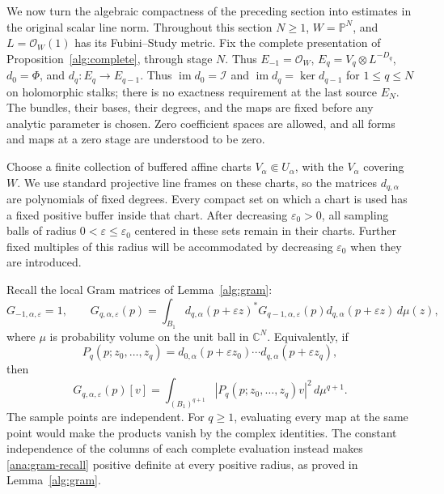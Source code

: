 \documentclass[11pt,reqno]{amsart}
\numberwithin{equation}{section}
\theoremstyle{definition}
\theoremstyle{remark}
\newcommand{\C}{\mathbb C}
\newcommand{\Pj}{\mathbb P}
\newcommand{\cO}{\mathcal O}
\newcommand{\cI}{\mathcal I}
\DeclareMathOperator{\im}{im}
\begin{document}
We now turn the algebraic compactness of the preceding section into
estimates in the original scalar line norm.  Throughout this section
$N\geq1$, $W=\Pj^N$, and $L=\cO_W(1)$ has its Fubini--Study metric.
Fix the complete presentation of Proposition~\ref{alg:complete}, through
stage $N$.  Thus $E_{-1}=\cO_W$, $E_q=V_q\otimes L^{-D_q}$,
$d_0=\Phi$, and $d_q:E_q\to E_{q-1}$.  Thus $\im d_0=\cI$ and
$\im d_q=\ker d_{q-1}$ for $1\leq q\leq N$ on holomorphic stalks;
there is no exactness requirement at the last source $E_N$.
The bundles, their bases, their degrees, and the maps are fixed before any
analytic parameter is chosen.  Zero coefficient spaces are allowed, and
all forms and maps at a zero stage are understood to be zero.

Choose a finite collection of buffered affine charts
$V_\alpha\Subset U_\alpha$, with the $V_\alpha$ covering $W$.
We use standard projective line frames on these charts, so the matrices
$d_{q,\alpha}$ are polynomials of fixed degrees.  Every compact set on
which a chart is used has a fixed positive buffer inside that chart.
After decreasing $\varepsilon_0>0$, all sampling balls of radius
$0<\varepsilon\leq\varepsilon_0$ centered in these sets remain in their
charts.  Further fixed multiples of this radius will be accommodated
by decreasing $\varepsilon_0$ when they are introduced.

Recall the local Gram matrices of Lemma~\ref{alg:gram}:
\begin{equation}\label{ana:gram-recall}
 G_{-1,\alpha,\varepsilon}=1,\qquad
 G_{q,\alpha,\varepsilon}(p)
 =\int_{B_1}d_{q,\alpha}(p+\varepsilon z)^*
 G_{q-1,\alpha,\varepsilon}(p)
 d_{q,\alpha}(p+\varepsilon z)\,d\mu(z),
\end{equation}
where $\mu$ is probability volume on the unit ball in $\C^N$.
Equivalently, if
\[
 P_q(p;z_0,\ldots,z_q)
 =d_{0,\alpha}(p+\varepsilon z_0)\cdots
 d_{q,\alpha}(p+\varepsilon z_q),
\]
then
\begin{equation}\label{ana:product-gram}
 G_{q,\alpha,\varepsilon}(p)[v]
 =\int_{(B_1)^{q+1}}|P_q(p;z_0,\ldots,z_q)v|^2\,d\mu^{q+1}.
\end{equation}
The sample points are independent. For $q\geq1$, evaluating every map
at the same point would make the products vanish by the complex identities.
The constant independence of the columns of each complete evaluation
instead makes \eqref{ana:gram-recall} positive definite at every
positive radius, as proved in Lemma~\ref{alg:gram}.
\end{document}
